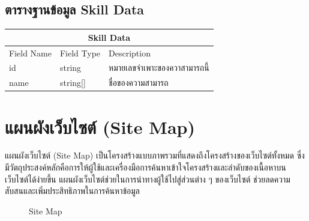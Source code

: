 \subsection{ตารางฐานข้อมูล Skill Data}
\begin{table}[H]
    \begin{tabularx}{\textwidth}{|l|l|X|}
        \hline
        \multicolumn{3}{|c|}{Skill Data}                              \\\hline
        Field Name    & Field Type & Description                  \\\hline
        id    & string     & หมายเลขจำเพาะของควาสามารถนี้       \\
        name  & string[]   & ชื่อของความสามารถ \\ \hline
    \end{tabularx}
\end{table}


\section{แผนผังเว็บไซต์ (Site Map)}
แผนผังเว็บไซต์ (Site Map) เป็นโครงสร้างแบบภาพรวมที่แสดงถึงโครงสร้างของเว็บไซต์ทั้งหมด ซึ่งมีวัตถุประสงค์หลักคือการให้ผู้ใช้และเครื่องมือการค้นหาเข้าใจโครงสร้างและลำดับของเนื้อหาบนเว็บไซต์ได้ง่ายขึ้น แผนผังเว็บไซต์ช่วยในการนำทางผู้ใช้ไปสู่ส่วนต่าง ๆ ของเว็บไซต์ ช่วยลดความสับสนและเพิ่มประสิทธิภาพในการค้นหาข้อมูล

\begin{figure}[H]\centering
    \setlength{\fboxrule}{0.2mm} %
    \setlength{\fboxsep}{0.5cm}
    \caption{Site Map}\label{fig:siteMap}
\end{figure}

